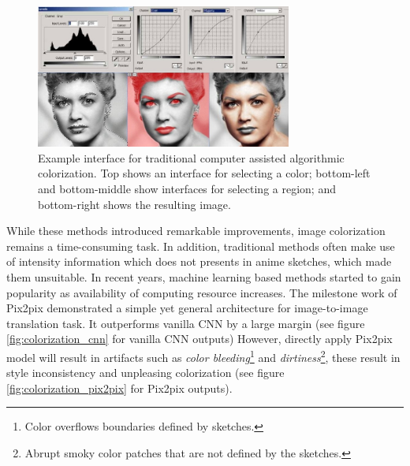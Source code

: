 \begin{figure}
    \centering
    \includegraphics[width=0.75\textwidth]{images/colorization/computer_assisted_colorization.jpg}
    \caption{Example interface for traditional computer assisted algorithmic colorization. Top shows an interface for selecting a color; bottom-left and bottom-middle show interfaces for selecting a region; and bottom-right shows the resulting image.\cite{ColorizeBlackWhite}}
    \label{fig:computer_assisted_colorization}
\end{figure}



While these methods introduced remarkable improvements, image colorization remains a time-consuming task. In addition, traditional methods often make use of intensity information which does not presents in anime sketches, which made them unsuitable. In recent years, machine learning based methods started to gain popularity as availability of computing resource increases. The milestone work of Pix2pix\cite{isolaImagetoImageTranslationConditional2018} demonstrated a simple yet general architecture for image-to-image translation task. It outperforms vanilla CNN by a large margin (see figure \ref{fig:colorization_cnn} for vanilla CNN outputs) However, directly apply Pix2pix model will result in artifacts such as \textit{color bleeding}\footnote{Color overflows boundaries defined by sketches.} and \textit{dirtiness}\footnote{Abrupt smoky color patches that are not defined by the sketches.}, these result in style inconsistency and unpleasing colorization (see figure \ref{fig:colorization_pix2pix} for Pix2pix outputs). 

